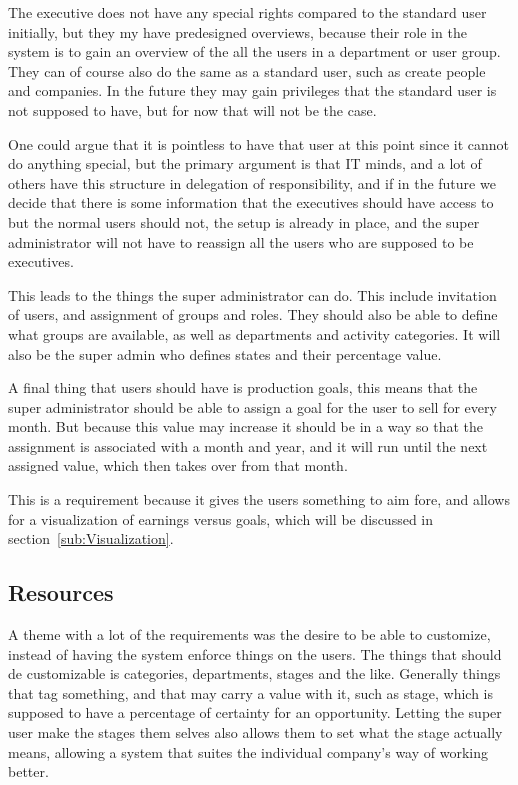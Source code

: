 The executive does not have any special rights compared to the standard user initially, but they my have predesigned overviews, because their role in the system is to gain an overview of the all the users in a department or user group. They can of course also do the same as a standard user, such as create people and companies. In the future they may gain privileges that the standard user is not supposed to have, but for now that will not be the case.

One could argue that it is pointless to have that user at this point since it cannot do anything special, but the primary argument is that IT minds, and a lot of others have this structure in delegation of responsibility, and if in the future we decide that there is some information that the executives should have access to but the normal users should not, the setup is already in place, and the super administrator will not have to reassign all the users who are supposed to be executives.

This leads to the things the super administrator can do. This include invitation of users, and assignment of groups and roles. They should also be able to define what groups are available, as well as departments and activity categories. It will also be the super admin who defines states and their percentage value.

A final thing that users should have is production goals, this means that the super administrator should be able to assign a goal for the user to sell for every month. But because this value may increase it should be in a way so that the assignment is associated with a month and year, and it will run until the next assigned value, which then takes over from that month.

This is a requirement because it gives the users something to aim fore, and allows for a visualization of earnings versus goals, which will be discussed in section~\ref{sub:Visualization}.

\subsection{Resources}
\label{sub:Resources}

A theme with a lot of the requirements was the desire to be able to customize, instead of having the system enforce things on the users. The things that should de customizable is categories, departments, stages and the like. Generally things that tag something, and that may carry a value with it, such as stage, which is supposed to have a percentage of certainty for an opportunity. Letting the super user make the stages them selves also allows them to set what the stage actually means, allowing a system that suites the individual company's way of working better.

